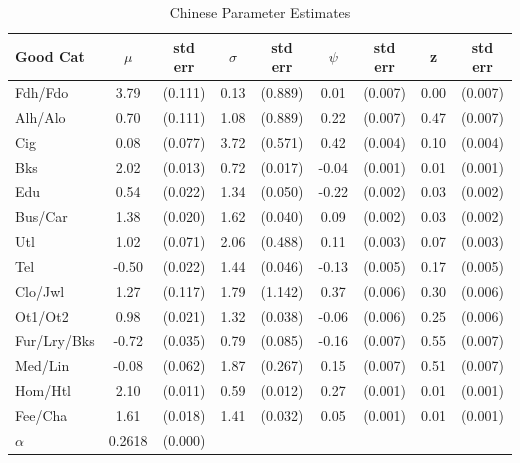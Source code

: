 \begin{table}
    \centering
	\begin{tabular}{lcccccccc}
		\hline
		Good Cat & $\mu$ & std err      & $\sigma$ & std err  & $\psi$ & std err & z & std err\\
		\hline \hline
		Fdh/Fdo     &  3.79 & (0.111) & 0.13 & (0.889) &  0.01 & (0.007)& 0.00 & (0.007)\\
		Alh/Alo     &  0.70 & (0.111) & 1.08 & (0.889) &  0.22 & (0.007)& 0.47 & (0.007)\\
		Cig         &  0.08 & (0.077) & 3.72 & (0.571) &  0.42 & (0.004)& 0.10 & (0.004)\\
		Bks         &  2.02 & (0.013) & 0.72 & (0.017) & -0.04 & (0.001)& 0.01 & (0.001)\\
		Edu         &  0.54 & (0.022) & 1.34 & (0.050) & -0.22 & (0.002)& 0.03 & (0.002)\\
		Bus/Car     &  1.38 & (0.020) & 1.62 & (0.040) &  0.09 & (0.002)& 0.03 & (0.002)\\
		Utl         &  1.02 & (0.071) & 2.06 & (0.488) &  0.11 & (0.003)& 0.07 & (0.003)\\
		Tel         & -0.50 & (0.022) & 1.44 & (0.046) & -0.13 & (0.005)& 0.17 & (0.005)\\
		Clo/Jwl     &  1.27 & (0.117) & 1.79 & (1.142) &  0.37 & (0.006)& 0.30 & (0.006)\\
		Ot1/Ot2     &  0.98 & (0.021) & 1.32 & (0.038) & -0.06 & (0.006)& 0.25 & (0.006)\\
		Fur/Lry/Bks & -0.72 & (0.035) & 0.79 & (0.085) & -0.16 & (0.007)& 0.55 & (0.007)\\
		Med/Lin     & -0.08 & (0.062) & 1.87 & (0.267) &  0.15 & (0.007)& 0.51 & (0.007)\\
		Hom/Htl     &  2.10 & (0.011) & 0.59 & (0.012) &  0.27 & (0.001)& 0.01 & (0.001)\\
		Fee/Cha     &  1.61 & (0.018) & 1.41 & (0.032) &  0.05 & (0.001)& 0.01 & (0.001)\\
		\hline
		$\alpha$ & 0.2618 & (0.000) & & & & \\
		\hline
	\end{tabular}
     	\linebreak
    \caption{Chinese Parameter Estimates}
    \label{tab:chnparest}
\end{table}

